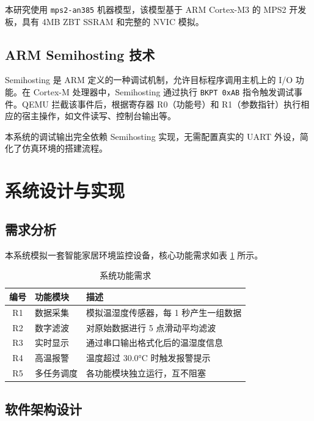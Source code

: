 \documentclass[12pt,a4paper]{ctexart}
\begin{document}
本研究使用 \texttt{mps2-an385} 机器模型，该模型基于 ARM Cortex-M3 的 MPS2 开发板，具有 4MB ZBT SSRAM 和完整的 NVIC 模拟。

\subsection{ARM Semihosting 技术}

Semihosting 是 ARM 定义的一种调试机制，允许目标程序调用主机上的 I/O 功能。在 Cortex-M 处理器中，Semihosting 通过执行 \texttt{BKPT 0xAB} 指令触发调试事件。QEMU 拦截该事件后，根据寄存器 R0（功能号）和 R1（参数指针）执行相应的宿主操作，如文件读写、控制台输出等。

本系统的调试输出完全依赖 Semihosting 实现，无需配置真实的 UART 外设，简化了仿真环境的搭建流程。

\section{系统设计与实现}\label{sec:design}

\subsection{需求分析}

本系统模拟一套智能家居环境监控设备，核心功能需求如表 \ref{tab:requirements} 所示。

\begin{table}[H]
\centering
\caption{系统功能需求}
\label{tab:requirements}
\begin{tabular}{cll}
\toprule
\textbf{编号} & \textbf{功能模块} & \textbf{描述} \\
\midrule
R1 & 数据采集 & 模拟温湿度传感器，每 1 秒产生一组数据 \\
R2 & 数字滤波 & 对原始数据进行 5 点滑动平均滤波 \\
R3 & 实时显示 & 通过串口输出格式化后的温湿度信息 \\
R4 & 高温报警 & 温度超过 30.0°C 时触发报警提示 \\
R5 & 多任务调度 & 各功能模块独立运行，互不阻塞 \\
\bottomrule
\end{tabular}
\end{table}

\subsection{软件架构设计}
\end{document}
